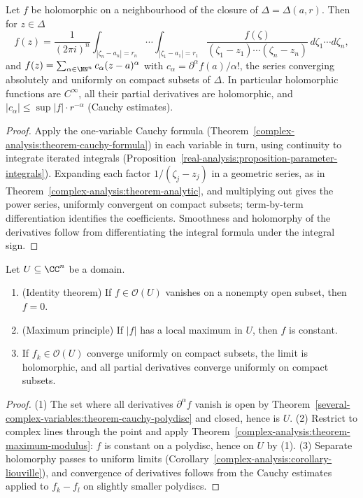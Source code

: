 \begin{theorem}\label{several-complex-variables:theorem-cauchy-polydisc}
Let $f$ be holomorphic on a neighbourhood of the closure of $\Delta = \Delta(a, r)$. Then for $z \in \Delta$
\[
f(z) = \frac{1}{(2\pi i)^n}\int_{|\zeta_n - a_n| = r_n}\cdots\int_{|\zeta_1 - a_1| = r_1}\frac{f(\zeta)}{(\zeta_1 - z_1)\cdots(\zeta_n - z_n)}\,d\zeta_1\cdots d\zeta_n,
\]
and $f(z) = \sum_{\alpha \in \NN^n}c_\alpha(z - a)^\alpha$ with $c_\alpha = \partial^\alpha f(a)/\alpha!$, the series converging absolutely and uniformly on compact subsets of $\Delta$. In particular
holomorphic functions are $C^\infty$, all their partial derivatives are holomorphic, and $|c_\alpha| \leq \sup|f| \cdot r^{-\alpha}$ (Cauchy estimates).
\end{theorem}

\begin{proof}
Apply the one-variable Cauchy formula (Theorem~\ref{complex-analysis:theorem-cauchy-formula}) in each variable in turn, using continuity to integrate iterated integrals
(Proposition~\ref{real-analysis:proposition-parameter-integrals}). Expanding each factor $1/(\zeta_j - z_j)$ in a geometric series, as in Theorem~\ref{complex-analysis:theorem-analytic}, and
multiplying out gives the power series, uniformly convergent on compact subsets; term-by-term differentiation identifies the coefficients. Smoothness and holomorphy of the derivatives follow from
differentiating the integral formula under the integral sign.
\end{proof}

\begin{proposition}\label{several-complex-variables:proposition-identity-maximum}
Let $U \subseteq \CC^n$ be a domain.
\begin{enumerate}
\item (Identity theorem) If $f \in \mathcal{O}(U)$ vanishes on a nonempty open subset, then $f = 0$.
\item (Maximum principle) If $|f|$ has a local maximum in $U$, then $f$ is constant.
\item If $f_k \in \mathcal{O}(U)$ converge uniformly on compact subsets, the limit is holomorphic, and all partial derivatives converge uniformly on compact subsets.
\end{enumerate}
\end{proposition}

\begin{proof}
(1) The set where all derivatives $\partial^\alpha f$ vanish is open by Theorem~\ref{several-complex-variables:theorem-cauchy-polydisc} and closed, hence is $U$. (2) Restrict to complex lines through the
point and apply Theorem~\ref{complex-analysis:theorem-maximum-modulus}: $f$ is constant on a polydisc, hence on $U$ by (1). (3) Separate holomorphy passes to uniform limits
(Corollary~\ref{complex-analysis:corollary-liouville}), and convergence of derivatives follows from the Cauchy estimates applied to $f_k - f_l$ on slightly smaller polydiscs.
\end{proof}

